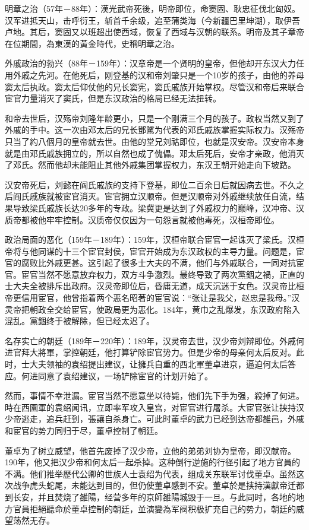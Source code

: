 明章之治（57年－88年）：漢光武帝死後，明帝即位，命窦固、耿忠征伐北匈奴。汉军进抵天山，击呼衍王，斩首千余级，追至蒲类海（今新疆巴里坤湖），取伊吾卢地。其后，窦固又以班超出使西域，恢复了西域与汉朝的联系。明帝及其子章帝在位期間，為東漢的黃金時代，史稱明章之治。

外戚政治的勃兴（88年－159年）：汉章帝是一个贤明的皇帝，但他却开东汉大力任用外戚之先河。在他死后，刚登基的汉和帝刘肇只是一个10岁的孩子，由他的养母窦太后执政。窦太后仰仗他的兄长窦宪，窦氏戚族开始掌权。尽管汉和帝后来联合宦官力量消灭了窦氏，但是东汉政治的格局已经无法扭转。

和帝去世后，汉殇帝刘隆年龄更小，只是一个刚满三个月的孩子。政权当然又到了外戚的手中。这一次由邓太后的兄长鄧騭为代表的邓氏戚族掌握实际权力。汉殇帝只当了約八個月的皇帝就去世。由他的堂兄刘祜即位，也就是汉安帝。汉安帝本身就是由邓氏戚族拥立的，所以自然也成了傀儡。邓太后死后，安帝才亲政，他消灭了邓氏。然而他却未能阻止其他外戚集团掌握权力，东汉王朝开始走向下坡路。

汉安帝死后，刘懿在阎氏戚族的支持下登基，即位二百余日后就因病去世。不久之后阎氏戚族就被宦官消灭。宦官拥立汉顺帝。但是汉顺帝对外戚继续放任自流，结果导致梁氏戚族长达20多年的专政。梁冀更是达到了外戚权力的巅峰，汉冲帝、汉质帝都被他牢牢控制。汉质帝仅仅因为一句怨言就被他毒死，汉桓帝即位。

政治局面的恶化（159年－189年）：159年，汉桓帝联合宦官一起诛灭了梁氏。汉桓帝将与他同谋的十三个宦官封侯，宦官开始成为东汉政权的主导力量。问题是，宦官的腐败比外戚更甚。这引起了很多士大夫的不满，他们与外戚联合，一同对抗宦官。宦官当然不愿意放弃权力，双方斗争激烈。最终导致了两次黨錮之禍，正直的士大夫全被排斥出政府。汉灵帝即位后，昏庸无道，成天沉迷于女色。汉灵帝比桓帝更信用宦官，他曾指着两个恶名昭著的宦官说：“张让是我父，赵忠是我母。”汉灵帝把朝政全交给宦官，使政局更为恶化。184年，黄巾之乱爆发，东汉政府陷入混乱。黨錮终于被解除，但已经太迟了。

名存实亡的朝廷（189年－220年）：189年，汉灵帝去世，汉少帝刘辩即位。外戚何进官拜大將軍，掌控朝廷，他打算铲除宦官势力。但是少帝的母亲何太后反对。此时，士大夫领袖的袁绍提出建议，让擁兵自重的西北軍董卓进京，逼迫何太后答应。何进同意了袁绍建议，一场铲除宦官的计划开始了。

然而，事情不幸泄漏。宦官当然不愿意坐以待毙，他们先下手为强，殺掉了何进。時在西園軍的袁绍闻讯，立即率军攻入皇宫，对宦官进行屠杀。大宦官张让挟持汉少帝逃走，追兵赶到，張讓自杀身亡。可此时董卓的武力已经到达帝都雒邑，外戚和宦官的势力同归于尽，董卓控制了朝廷。

董卓为了树立威望，他首先废掉了汉少帝，立他的弟弟刘协为皇帝，即汉献帝。190年，他又把汉少帝和何太后一起杀掉。这种倒行逆施的行径引起了地方官員的不满。他们推举歷代公卿的世族人士袁绍为代表，组成关东联军讨伐董卓。虽然这次战争虎头蛇尾，未能达到目的，但仍使董卓感到不安。董卓於是挟持漢獻帝迁都到长安，并且焚烧了雒陽，经营多年的京師雒陽城毁于一旦。与此同时，各地的地方官員拒絕聽命於董卓控制的朝廷，並演變為军阀积极扩充自己的势力，朝廷的威望荡然无存。

